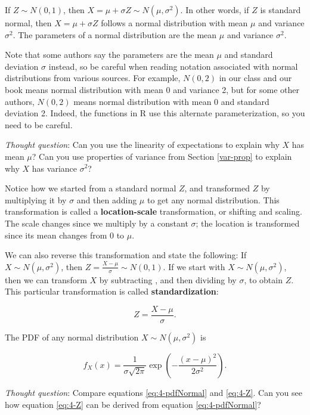 \documentclass[
]{book}
\begin{document}
If \(Z \sim N(0,1)\), then \(X = \mu + \sigma Z \sim N(\mu, \sigma^2)\). In other words, if \(Z\) is standard normal, then \(X = \mu + \sigma Z\) follows a normal distribution with mean \(\mu\) and variance \(\sigma^2\). The parameters of a normal distribution are the mean \(\mu\) and variance \(\sigma^2\).

Note that some authors say the parameters are the mean \(\mu\) and standard deviation \(\sigma\) instead, so be careful when reading notation associated with normal distributions from various sources. For example, \(N(0,2)\) in our class and our book means normal distribution with mean 0 and variance 2, but for some other authors, \(N(0,2)\) means normal distribution with mean 0 and standard deviation 2. Indeed, the functions in R use this alternate parameterization, so you need to be careful.

\emph{Thought question}: Can you use the linearity of expectations to explain why \(X\) has mean \(\mu\)? Can you use properties of variance from Section \ref{var-prop} to explain why \(X\) has variance \(\sigma^2\)?

Notice how we started from a standard normal \(Z\), and transformed \(Z\) by multiplying it by \(\sigma\) and then adding \(\mu\) to get any normal distribution. This transformation is called a \textbf{location-scale} transformation, or shifting and scaling. The scale changes since we multiply by a constant \(\sigma\); the location is transformed since its mean changes from 0 to \(\mu\).

We can also reverse this transformation and state the following: If \(X \sim N(\mu, \sigma^2)\), then \(Z = \frac{X-\mu}{\sigma} \sim N(0,1)\). If we start with \(X \sim N(\mu, \sigma^2)\), then we can transform \(X\) by subtracting \mu, and then dividing by \(\sigma\), to obtain \(Z\). This particular transformation is called \textbf{standardization}:

\begin{equation} 
Z = \frac{X-\mu}{\sigma}.
\label{eq:4-standardize}
\end{equation}

The PDF of any normal distribution \(X \sim N(\mu, \sigma^2)\) is

\begin{equation} 
f_X(x) = \frac{1}{\sigma \sqrt{2 \pi}} \exp \left(-\frac{(x - \mu)^2}{2 \sigma^2} \right).
\label{eq:4-pdfNormal}
\end{equation}

\emph{Thought question}: Compare equations \eqref{eq:4-pdfNormal} and \eqref{eq:4-Z}. Can you see how equation \eqref{eq:4-Z} can be derived from equation \eqref{eq:4-pdfNormal}?
\end{document}
